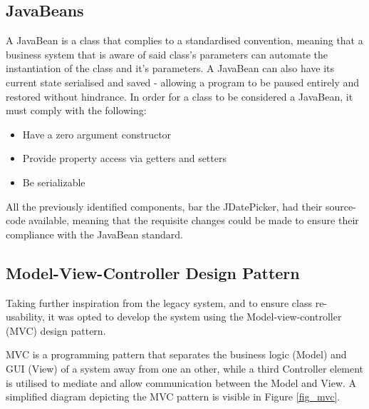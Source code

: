 \documentclass[12pt, a4paper,titlepage]{article}
\begin{document}
\subsection{JavaBeans}
A JavaBean is a class that complies to a standardised convention, meaning that
a business system that is aware of said class’s parameters can automate the
instantiation of the class and it’s parameters. 
A JavaBean can also have its current state serialised and saved - allowing a
program to be paused entirely and restored without hindrance.  
In order for a class to be considered a JavaBean, it must comply with the
following:
\begin{itemize}
    \item Have a zero argument constructor
    \item Provide property access via getters and setters
    \item Be serializable
\end{itemize}

All the previously identified components, bar the JDatePicker, had their
source-code available, meaning that the requisite changes could be made to
ensure their compliance with the JavaBean standard.

\subsection{Model-View-Controller Design Pattern}
Taking further inspiration from the legacy system, and to ensure class
re-usability, it was opted to develop the system using the
Model-view-controller (MVC) design pattern.

MVC is a programming  pattern that separates the business logic (Model) and GUI
(View) of a system away from one an other, while a third Controller element is
utilised to mediate and allow communication between the Model and View.
A simplified diagram depicting the MVC pattern is visible in Figure
\ref{fig_mvc}.
\end{document}
